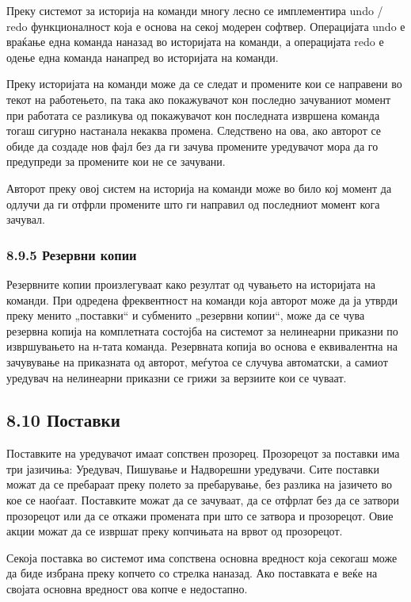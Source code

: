Преку системот за историја на команди многу лесно се имплементира undo / redo функционалност која е основа на секој модерен софтвер. Операцијата undo е враќање една команда наназад во историјата на команди, а операцијата redo е одење една команда нанапред во историјата на команди.

Преку историјата на команди може да се следат и промените кои се направени во текот на работењето, па така ако покажувачот кон последно зачуваниот момент при работата се разликува од покажувачот кон последната извршена команда тогаш сигурно настанала некаква промена. Следствено на ова, ако авторот се обиде да создаде нов фајл без да ги зачува промените уредувачот мора да го предупреди за промените кои не се зачувани.

Авторот преку овој систем на историја на команди може во било кој момент да одлучи да ги отфрли промените што ги направил од последниот момент кога зачувал.

\subsubsection{8.9.5 Резервни копии}

Резервните копии произлегуваат како резултат од чувањето на историјата на команди. При одредена фреквентност на команди која авторот може да ја утврди преку менито „поставки“ и субменито „резервни копии“, може да се чува резервна копија на комплетната состојба на системот за нелинеарни приказни по извршувањето на н-тата команда. Резервната копија во основа е еквивалентна на зачувување на приказната од авторот, меѓутоа се случува автоматски, а самиот уредувач на нелинеарни приказни се грижи за верзиите кои се чуваат.

\subsection{8.10 Поставки}

Поставките на уредувачот имаат сопствен прозорец. Прозорецот за поставки има три јазичиња: Уредувач, Пишување и Надворешни уредувачи. Сите поставки можат да се пребараат преку полето за пребарување, без разлика на јазичето во кое се наоѓаат. Поставките можат да се зачуваат, да се отфрлат без да се затвори прозорецот или да се откажи промената при што се затвора и прозорецот. Овие акции можат да се извршат преку копчињата на врвот од прозорецот.

Секоја поставка во системот има сопствена основна вредност која секогаш може да биде избрана преку копчето со стрелка наназад. Ако поставката е веќе на својата основна вредност ова копче е недостапно.

